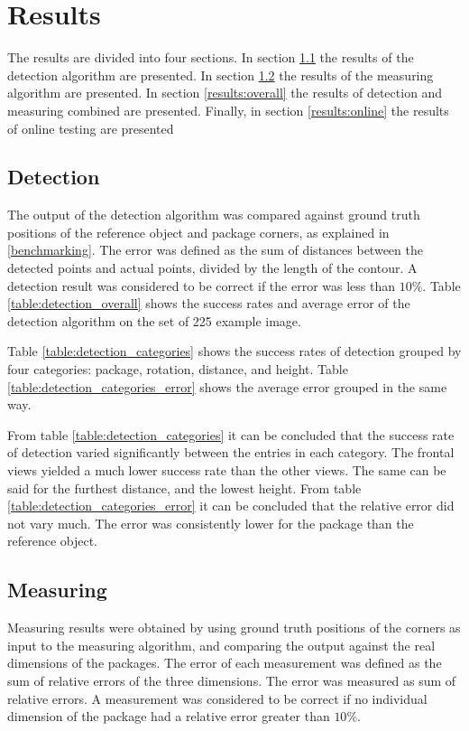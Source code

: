 \chapter{Results} \label{results}
The results are divided into four sections.
In section \ref{results:detection} the results of the detection algorithm are presented.
In section \ref{results:measuring} the results of the measuring algorithm are presented.
In section \ref{results:overall} the results of detection and measuring combined are presented.
Finally, in section \ref{results:online} the results of online testing are presented

\section{Detection} \label{results:detection}
The output of the detection algorithm was compared against ground truth positions of the reference object and package corners, as explained in \ref{benchmarking}.
The error was defined as the sum of distances between the detected points and actual points, divided by the length of the contour.
A detection result was considered to be correct if the error was less than $10\%$.
Table \ref{table:detection_overall} shows the success rates and average error of the detection algorithm on the set of 225 example image.



Table \ref{table:detection_categories} shows the success rates of detection grouped by four categories: package, rotation, distance, and height. Table \ref{table:detection_categories_error} shows the average error grouped in the same way.





From table \ref{table:detection_categories} it can be concluded that the success rate of detection varied significantly between the entries in each category.
The frontal views yielded a much lower success rate than the other views.
The same can be said for the furthest distance, and the lowest height. 
From table \ref{table:detection_categories_error} it can be concluded that the relative error did not vary much.
The error was consistently lower for the package than the reference object. %

\section{Measuring} \label{results:measuring} 
Measuring results were obtained by using ground truth positions of the corners as input to the measuring algorithm, and comparing the output against the real dimensions of the packages.
The error of each measurement was defined as the sum of relative errors of the three dimensions.
The error was measured as sum of relative errors.
A measurement was considered to be correct if no individual dimension of the package had a relative error greater than $10\%$.

